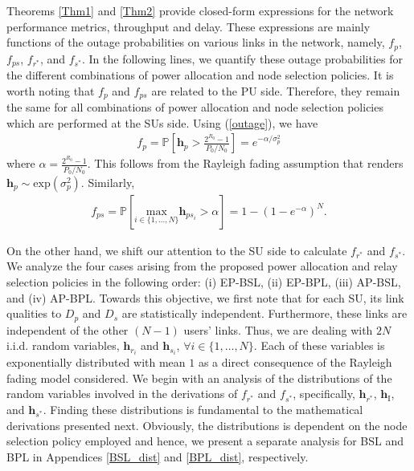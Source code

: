 \documentclass[journal,twocolumn]{IEEEtran}
\begin{document}
Theorems \ref{Thm1} and \ref{Thm2} provide closed-form expressions for the network performance metrics, throughput and delay. These expressions are mainly functions of the outage probabilities on various links in the network, namely, $f_{p}$, $f_{ps}$, $f_{r^*}$, and $f_{s^*}$. In the following lines, we quantify these outage probabilities for the different combinations of power allocation and node selection policies. It is worth noting that $f_{p}$ and $f_{ps}$ are related to the PU side. Therefore, they remain the same for all combinations of power allocation and node selection policies which are performed at the SUs side. Using (\ref{outage}), we have
\begin{align}\label{fpDp}
f_{p}=\mathbb{P}\left[ \mathbf{h}_{p} > \frac{2^{R_{0}}-1}{P_{0}/N_{0}} \right]=e^{-\alpha/\sigma_{p}^{2}}
\end{align}
where $\alpha=\frac{2^{R_{0}}-1}{P_{0}/N_{0}}$. This follows from the Rayleigh fading assumption that renders $\mathbf{h}_{p} \sim \mathrm{exp}(\sigma_{p}^{2})$. Similarly,
\begin{align}\label{fpstar}
f_{ps}=\mathbb{P}\left[ \underset{i \in \{1,\hdots,N\}}{\mathrm{max}} \mathbf{h}_{ps_i} > \alpha \right]=1-(1-e^{-\alpha})^N.
\end{align}


On the other hand, we shift our attention to the SU side to calculate $f_{r^*}$ and $f_{s^*}$. We analyze the four cases arising from the proposed power allocation and relay selection policies in the following order: (i) EP-BSL, (ii) EP-BPL, (iii) AP-BSL, and (iv) AP-BPL. 
Towards this objective, we first note that for each SU, its link qualities to $D_{p}$ and $D_{s}$ are statistically independent. Furthermore, these links are independent of the other $(N-1)$ users' links. Thus, we are dealing with $2N$ i.i.d. random variables, $\mathbf{h}_{r_{i}}$ and $\mathbf{h}_{s_{i}}$, $\forall i \in \{1,\hdots,N\}$. Each of these variables is exponentially distributed with mean $1$ as a direct consequence of the Rayleigh fading model considered. We begin with an analysis of the distributions of the random variables involved in the derivations of $f_{r^*}$ and $f_{s^*}$, specifically, $\mathbf{h}_{r^*}$, $\mathbf{h}_{\mathrm{I}}$, and $\mathbf{h}_{s^*}$. Finding these distributions is fundamental to the mathematical derivations presented next. Obviously, the distributions is dependent on the node selection policy employed and hence, we present a separate analysis for BSL and BPL in Appendices \ref{BSL_dist} and \ref{BPL_dist}, respectively.
\end{document}
